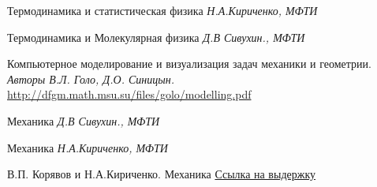 \documentclass[twoside,twocolumn, 11pt]{article}
\theoremstyle{plain}
\theoremstyle{definition}
\begin{document}
\begin{thebibliography}{99} %

Термодинамика и статистическая физика {\em
Н.А.Кириченко, МФТИ}

Термодинамика и Молекулярная физика {\em
Д.В Сивухин., МФТИ}

Компьютерное моделирование и визуализация задач механики и
геометрии. {\em Авторы В.Л. Голо, Д.О. Синицын.}
\href{http://dfgm.math.msu.su/files/golo/modelling.pdf}{http://dfgm.math.msu.su/files/golo/modelling.pdf}

Механика {\em
Д.В Сивухин., МФТИ}

Механика {\em
Н.А.Кириченко, МФТИ}

В.П. Корявов и Н.А.Кириченко. Механика
\href{https://vk.com/doc85020018_467835549?hash=d80f20a3d0b8f6643c&dl=bc29371e14b5f0ebd0}{Ссылка на выдержку}

\end{thebibliography}

\end{document}
